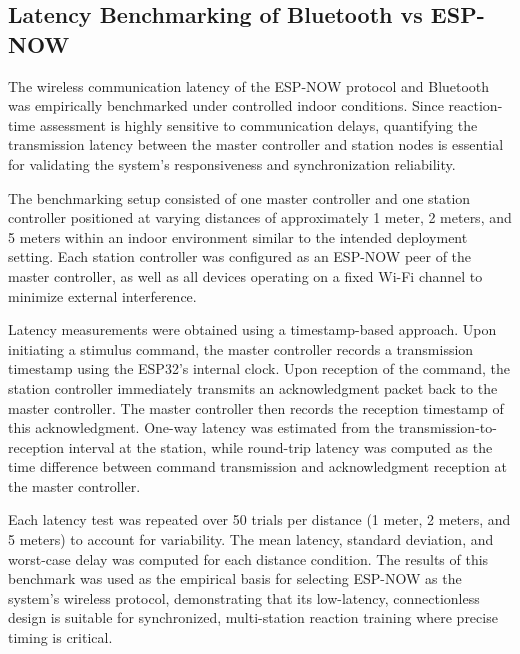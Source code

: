 \subsection{Latency Benchmarking of Bluetooth vs ESP-NOW}
	
	The wireless communication latency of the ESP-NOW protocol and Bluetooth was empirically benchmarked under controlled indoor conditions. Since reaction-time assessment is highly sensitive to communication delays, quantifying the transmission latency between the master controller and station nodes is essential for validating the system’s responsiveness and synchronization reliability.
	
	The benchmarking setup consisted of one master controller and one station controller positioned at varying distances of approximately 1 meter, 2 meters, and 5 meters within an indoor environment similar to the intended deployment setting. Each station controller was configured as an ESP-NOW peer of the master controller, as well as all devices operating on a fixed Wi-Fi channel to minimize external interference.
	
	Latency measurements were obtained using a timestamp-based approach. Upon initiating a stimulus command, the master controller records a transmission timestamp using the ESP32’s internal clock. Upon reception of the command, the station controller immediately transmits an acknowledgment packet back to the master controller. The master controller then records the reception timestamp of this acknowledgment. One-way latency was estimated from the transmission-to-reception interval at the station, while round-trip latency was computed as the time difference between command transmission and acknowledgment reception at the master controller.
	
	Each latency test was repeated over 50 trials per distance (1 meter, 2 meters, and 5 meters) to account for variability. The mean latency, standard deviation, and worst-case delay was computed for each distance condition. The results of this benchmark was used as the empirical basis for selecting ESP-NOW as the system’s wireless protocol, demonstrating that its low-latency, connectionless design is suitable for synchronized, multi-station reaction training where precise timing is critical.


